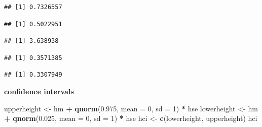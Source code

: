 \documentclass[]{article}
\newenvironment{Shaded}{\begin{snugshade}}{\end{snugshade}}
\newcommand{\KeywordTok}[1]{\textcolor[rgb]{0.13,0.29,0.53}{\textbf{#1}}}
\newcommand{\DataTypeTok}[1]{\textcolor[rgb]{0.13,0.29,0.53}{#1}}
\newcommand{\DecValTok}[1]{\textcolor[rgb]{0.00,0.00,0.81}{#1}}
\newcommand{\FloatTok}[1]{\textcolor[rgb]{0.00,0.00,0.81}{#1}}
\newcommand{\StringTok}[1]{\textcolor[rgb]{0.31,0.60,0.02}{#1}}
\newcommand{\OperatorTok}[1]{\textcolor[rgb]{0.81,0.36,0.00}{\textbf{#1}}}
\newcommand{\NormalTok}[1]{#1}
\begin{document}
\begin{verbatim}
## [1] 0.7326557
\end{verbatim}

\begin{Shaded}
\end{Shaded}

\begin{verbatim}
## [1] 0.5022951
\end{verbatim}

\begin{Shaded}
\end{Shaded}

\begin{verbatim}
## [1] 3.638938
\end{verbatim}

\begin{Shaded}
\end{Shaded}

\begin{verbatim}
## [1] 0.3571385
\end{verbatim}

\begin{Shaded}
\end{Shaded}

\begin{verbatim}
## [1] 0.3307949
\end{verbatim}

\textbf{confidence intervals}

\begin{Shaded}
\begin{Highlighting}[]
\NormalTok{upperheight <-}\StringTok{ }\NormalTok{hm }\OperatorTok{+}\StringTok{ }\KeywordTok{qnorm}\NormalTok{(}\FloatTok{0.975}\NormalTok{, }\DataTypeTok{mean =} \DecValTok{0}\NormalTok{, }\DataTypeTok{sd =} \DecValTok{1}\NormalTok{) }\OperatorTok{*}\StringTok{ }\NormalTok{hse}
\NormalTok{lowerheight <-}\StringTok{ }\NormalTok{hm }\OperatorTok{+}\StringTok{ }\KeywordTok{qnorm}\NormalTok{(}\FloatTok{0.025}\NormalTok{, }\DataTypeTok{mean =} \DecValTok{0}\NormalTok{, }\DataTypeTok{sd =} \DecValTok{1}\NormalTok{) }\OperatorTok{*}\StringTok{ }\NormalTok{hse }
\NormalTok{hci <-}\StringTok{ }\KeywordTok{c}\NormalTok{(lowerheight, upperheight)}
\NormalTok{hci}
\end{Highlighting}
\end{Shaded}
\end{document}
